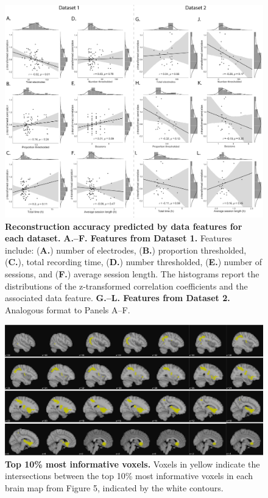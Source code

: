 \documentclass[10pt]{article}
\begin{document}
\begin{figure}[p]
\centering
\includegraphics[width=\textwidth]{figs/supplemental_4}
\caption{\textbf{Reconstruction accuracy predicted by data
    features for each dataset.} \textbf{A.--F.  Features from Dataset
    1.}  Features include: (\textbf{A.}) number of electrodes,
  (\textbf{B.}) proportion thresholded, (\textbf{C.}), total recording
  time, (\textbf{D.}) number thresholded, (\textbf{E.}) number of
  sessions, and (\textbf{F.}) average session length.  The histograms
  report the distributions of the z-transformed correlation
  coefficients and the associated data feature.
  \textbf{G.--L. Features from Dataset 2.}  Analogous format to Panels
  A--F.}
\label{fig:supplemental_4}
\end{figure}


\begin{figure}[ptb]
\centering
\includegraphics[width=\textwidth]{figs/supplemental_5}
\caption{\textbf{ Top 10\% most informative voxels.}
 Voxels in yellow indicate the intersections between
    the top 10\% most informative voxels in each brain map from Figure
    5, indicated by the white contours.}
\label{fig:supplemental_5}
\end{figure}


% 
\end{document}

